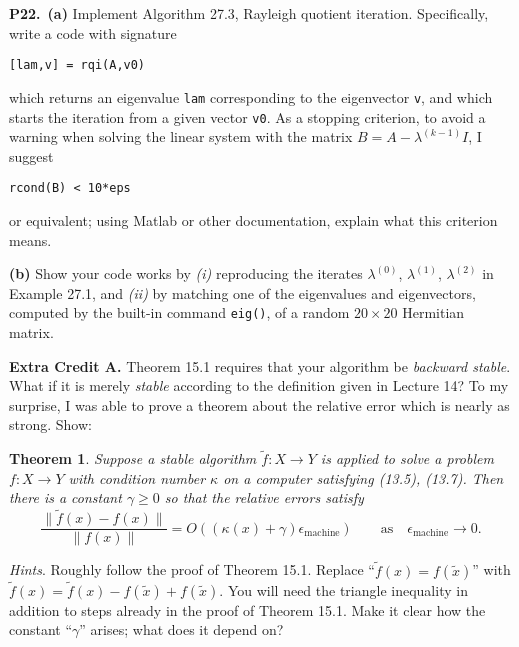 \documentclass[12pt]{amsart}
\newtheorem*{thm}{Theorem}
\newcommand{\eps}{\epsilon}
\newcommand{\prob}[1]{\bigskip\noindent\textbf{#1.}\quad }
\newcommand{\epart}[1]{\medskip\noindent\textbf{(#1)}\quad }
\newcommand{\ppart}[1]{\,\textbf{(#1)}\quad }
\begin{document}
\prob{P22}  \ppart{a}  Implement Algorithm 27.3, Rayleigh quotient iteration.  Specifically, write a code with signature
\begin{center}
\verb|[lam,v] = rqi(A,v0)|
\end{center}
which returns an eigenvalue \verb|lam| corresponding to the eigenvector \verb|v|, and which starts the iteration from a given vector \verb|v0|.  As a stopping criterion, to avoid a warning when solving the linear system with the matrix $B=A-\lambda^{(k-1)} I$, I suggest
\begin{center}
\verb|rcond(B) < 10*eps|
\end{center}
or equivalent; using Matlab or other documentation, explain what this criterion means.

\epart{b} Show your code works by \emph{(i)} reproducing the iterates $\lambda^{(0)}$, $\lambda^{(1)}$, $\lambda^{(2)}$ in Example 27.1, and \emph{(ii)} by matching one of the eigenvalues and eigenvectors, computed by the built-in command \verb|eig()|, of a random $20\times 20$ Hermitian matrix.


\prob{Extra Credit A}  Theorem 15.1 requires that your algorithm be \emph{backward stable}.  What if it is merely \emph{stable} according to the definition given in Lecture 14?  To my surprise, I was able to prove a theorem about the relative error which is nearly as strong.  Show:

\newcommand{\emach}{\eps_{\text{machine}}}
\begin{thm}
Suppose a stable algorithm $\tilde f:X\to Y$ is applied to solve a problem $f:X\to Y$ with condition number $\kappa$ on a computer satisfying (13.5), (13.7).  Then there is a constant $\gamma \ge 0$ so that the relative errors satisfy
    $$\frac{\|\tilde f(x) - f(x)\|}{\|f(x)\|} = O\left((\kappa(x) + \gamma) \emach\right) \qquad \text{as} \quad \emach \to 0.$$
\end{thm}

\medskip
\noindent \emph{Hints}.  Roughly follow the proof of Theorem 15.1.  Replace ``$\tilde f(x) = f(\tilde x)$'' with $\tilde f(x) = \tilde f(x) - f(\tilde x) + f(\tilde x)$.  You will need the triangle inequality in addition to steps already in the proof of Theorem 15.1.  Make it clear how the constant ``$\gamma$'' arises; what does it depend on?
\end{document}
